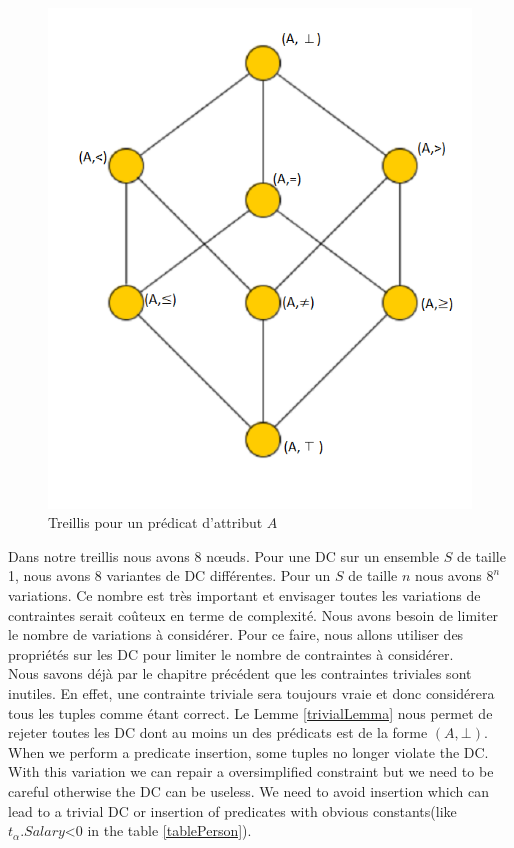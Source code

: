 \documentclass[letterpaper, 12pt]{report}
\theoremstyle{definition}
\begin{document}
\begin{figure}
	\centering
	\includegraphics[scale=0.5]{img/treillis}
	\caption{\label{treillis} Treillis pour un prédicat d'attribut $A$}
\end{figure}

Dans notre treillis nous avons 8 nœuds. Pour une DC sur un ensemble $S$ de taille 1, nous avons 8 variantes de DC différentes. Pour un $S$ de taille $n$ nous avons $8^n$ variations. Ce nombre est très important et envisager toutes les variations de contraintes serait coûteux en terme de complexité. Nous avons besoin de limiter le nombre de variations à considérer. Pour ce faire, nous allons utiliser des propriétés sur les DC pour limiter le nombre de contraintes à considérer.\\

Nous savons déjà par le chapitre précédent que les contraintes triviales sont inutiles. En effet, une contrainte triviale sera toujours vraie et donc considérera tous les tuples comme étant correct. Le Lemme \ref{trivialLemma} nous permet de rejeter toutes les DC dont au moins un des prédicats est de la forme $(A,\bot)$.
When we perform a predicate insertion, some tuples no longer violate the DC. With this variation we can repair a oversimplified constraint but we need to be careful otherwise the DC can be useless. We need to avoid insertion which can lead to a trivial DC or insertion of predicates with obvious constants(like $t_\alpha.Salary$<0 in the table \ref{tablePerson}). \\
\end{document}
